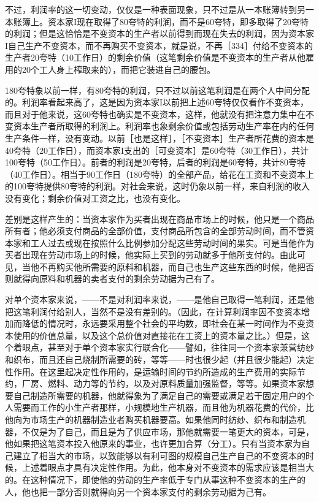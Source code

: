 不过，利润率的这一切变动，仅仅是一种表面现象，只不过是从一本账簿转到另一本账簿上。资本家I现在取得了80夸特的利润，而不是60夸特，即多取得了20夸特的利润；但是这恰恰是不变资本的生产者以前得到而现在失去的利润，因为资本家I自己生产不变资本，而不再购买不变资本，就是说，不再［334］付给不变资本的生产者20夸特（10工作日）的剩余价值（这笔剩余价值是不变资本的生产者从他雇用的20个工人身上榨取来的），而把它装进自己的腰包。

180夸特象以前一样，有80夸特的利润，只不过以前这笔利润是在两个人中间分配的。利润率看起来高了，这是因为资本家I以前把上述60夸特仅仅看作不变资本，而且对于他来说，这60夸特也确实是不变资本，这样，他就没有把注意力集中在不变资本生产者所取得的利润上。利润率也象剩余价值或包括劳动生产率在内的任何生产条件一样，没有变动。以前［也是这样］，［不变资本］生产者所花费的资本是40夸特（20工作日），而资本家I支出的［可变资本］是60夸特（30工作日），共计100夸特（50工作日）。前者的利润是20夸特，后者的利润是60夸特，共计80夸特（40工作日）。相当于90工作日（180夸特）的全部产品，给花在工资和不变资本上的100夸特提供80夸特的利润。对社会来说，这时仍象以前一样，来自利润的收入没有变化；剩余价值对工资之比，也没有变化。

差别是这样产生的：当资本家作为买者出现在商品市场上的时候，他只是一个商品所有者；他必须支付商品的全部价值，支付商品所包含的全部劳动时间，而不管资本家和工人过去或现在按照什么比例参加分配这些劳动时间的果实。可是当他作为买者出现在劳动市场上的时候，他实际上买到的劳动就多于他所支付的。由此可见，当他不再购买他所需要的原料和机器，而自己也生产这些东西的时候，他把否则就得向原料和机器的卖者支付的剩余劳动据为己有了。

对单个资本家来说，——不是对利润率来说，——是他自己取得一笔利润，还是他把这笔利润付给别人，当然不是没有差别的。（因此，在计算利润率因不变资本增加而降低的情况时，永远要采用整个社会的平均数，即社会在某一时间作为不变资本使用的价值总量，以及这个总价值对直接花在工资上的资本量之比。）但是，这个着眼点，甚至对于单个资本家实行联合化——譬如，往往同一个资本家兼营纺纱和织布，而且还自己烧制所需要的砖，等等——时也很少起（并且很少能起）决定性作用。在这里起决定性作用的，是运输时间的节约所造成的生产费用的实际节约，厂房、燃料、动力等的节约，以及对原料质量加强监督，等等。如果资本家想要自己制造所需要的机器，他就得象为了满足自己的需要或满足若干固定用户的个人需要而工作的小生产者那样，小规模地生产机器，而且他为机器花费的代价，比他向为市场生产的机器制造业者购买机器要高。如果他同时纺纱、织布和制造机器，不仅是为了自己，而且是为了供应市场，那他就需要一笔更大的资本，可是，他如果把这笔资本投入他原来的事业，也许更加合算（分工）。只有当资本家为自己建立了相当大的市场，以致能够以有利可图的规模自己生产自己的不变资本的时候，上述着眼点才具有决定性作用。为此，他本身对不变资本的需求应该是相当大的。在这种情况下，即使他的劳动的生产率低于专门从事这种不变资本的生产的人，他也把一部分否则就得向另一个资本家支付的剩余劳动据为己有。


